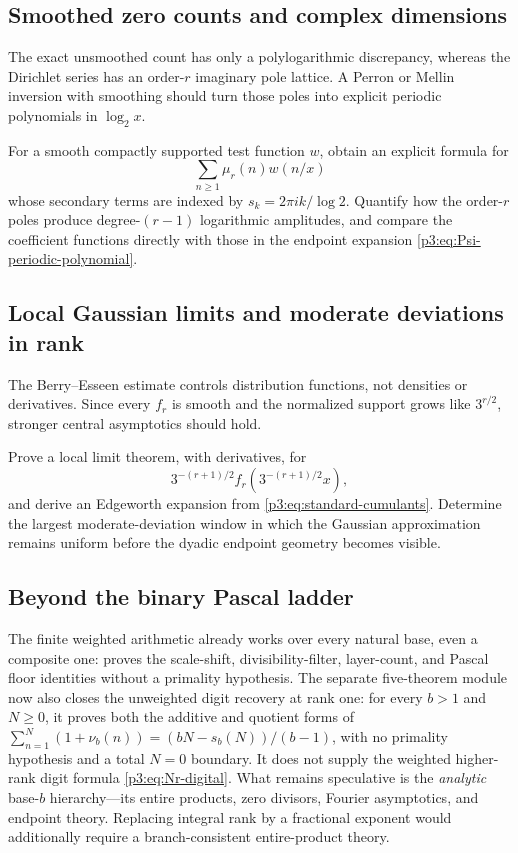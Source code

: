 \documentclass[11pt,oneside]{article}
\theoremstyle{definition}
\theoremstyle{remark}
\begin{document}
\subsection{Smoothed zero counts and complex dimensions}

The exact unsmoothed count has only a polylogarithmic discrepancy, whereas the Dirichlet series has an order-$r$ imaginary pole lattice.  A Perron or Mellin inversion with smoothing should turn those poles into explicit periodic polynomials in $\log_2x$.

\begin{frontierproblem}
For a smooth compactly supported test function $w$, obtain an explicit formula for
\[
 \sum_{n\ge1}\mu_r(n)w(n/x)
\]
whose secondary terms are indexed by $s_k=2\pi ik/\log2$.  Quantify how the order-$r$ poles produce degree-$(r-1)$ logarithmic amplitudes, and compare the coefficient functions directly with those in the endpoint expansion \eqref{p3:eq:Psi-periodic-polynomial}.
\end{frontierproblem}

\subsection{Local Gaussian limits and moderate deviations in rank}

The Berry--Esseen estimate controls distribution functions, not densities or derivatives.  Since every $f_r$ is smooth and the normalized support grows like $3^{r/2}$, stronger central asymptotics should hold.

\begin{frontierproblem}
Prove a local limit theorem, with derivatives, for
\[
 3^{-(r+1)/2}f_r\!\left(3^{-(r+1)/2}x\right),
\]
and derive an Edgeworth expansion from \eqref{p3:eq:standard-cumulants}.  Determine the largest moderate-deviation window in which the Gaussian approximation remains uniform before the dyadic endpoint geometry becomes visible.
\end{frontierproblem}

\subsection{Beyond the binary Pascal ladder}

The finite weighted arithmetic already works over every natural base, even a
composite one:  proves the scale-shift,
divisibility-filter, layer-count, and Pascal floor identities without a
primality hypothesis.  The separate five-theorem module
 now also closes the unweighted digit recovery
at rank one: for every \(b>1\) and \(N\ge0\), it proves both the additive and
quotient forms of
\(\sum_{n=1}^{N}(1+\nu_b(n))=(bN-s_b(N))/(b-1)\), with no primality
hypothesis and a total \(N=0\) boundary.  It does not supply the weighted
higher-rank digit formula \eqref{p3:eq:Nr-digital}.  What remains speculative is the \emph{analytic}
base-$b$ hierarchy---its entire products, zero divisors, Fourier asymptotics,
and endpoint theory.  Replacing integral rank by a fractional exponent would
additionally require a branch-consistent entire-product theory.
\end{document}
